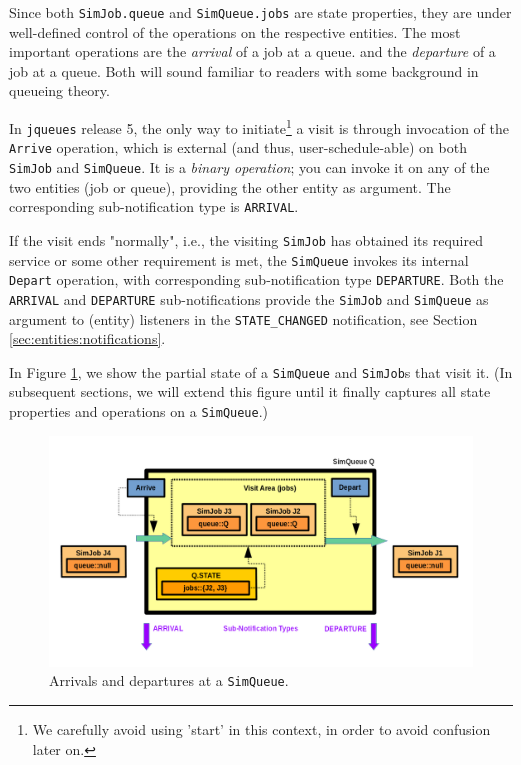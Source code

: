 Since both \lstinline|SimJob.queue|
  and \lstinline|SimQueue.jobs|
  are state properties,
  they are under well-defined
  control of the operations
  on the respective entities.
The most important operations
  are the {\em arrival\/} of a job at a queue.
  and the {\em departure\/} of a job at a queue.
Both will sound familiar to readers with
  some background in queueing theory.
  
In \lstinline|jqueues| release 5,
  the only way to initiate\footnote{We carefully avoid using 'start'
  in this context, in order to avoid confusion later on.}
  a visit is through invocation of the \lstinline|Arrive|
  operation,
  which is external (and thus, user-schedule-able)
  on both \lstinline|SimJob| and \lstinline|SimQueue|.
It is a {\em binary operation\/};
  you can invoke it on any of the two entities
  (job or queue),
  providing the other entity as argument.
The corresponding sub-notification type
  is \lstinline|ARRIVAL|.

If the visit ends "normally",
  i.e.,
  the visiting \lstinline|SimJob|
  has obtained its required service
  or some other requirement is met,
  the \lstinline|SimQueue|
  invokes its internal \lstinline|Depart|
  operation,
  with corresponding sub-notification type
  \lstinline|DEPARTURE|.
Both the \lstinline|ARRIVAL| and \lstinline|DEPARTURE|
  sub-notifications provide the
  \lstinline|SimJob| and \lstinline|SimQueue|
  as argument to (entity) listeners
  in the \lstinline|STATE_CHANGED| notification,
  see Section \ref{sec:entities:notifications}.
  
In Figure \ref{fig:ArriveDepart},
  we show the partial state of
  a \lstinline|SimQueue|
  and \lstinline|SimJob|s that visit it.
(In subsequent sections,
  we will extend this figure until it finally
  captures all state properties and operations
  on a \lstinline|SimQueue|.)
  
\begin{figure}[!htbp]
  \label{fig:ArriveDepart}
  \caption{Arrivals and departures at a \texttt{SimQueue}.}
  \includegraphics[width=\textwidth]{fig/ArriveDepart}
\end{figure}
    
